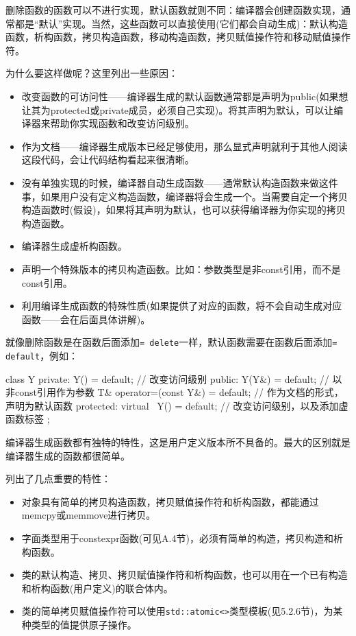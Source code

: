 
删除函数的函数可以不进行实现，默认函数就则不同：编译器会创建函数实现，通常都是“默认”实现。当然，这些函数可以直接使用(它们都会自动生成)：默认构造函数，析构函数，拷贝构造函数，移动构造函数，拷贝赋值操作符和移动赋值操作符。

为什么要这样做呢？这里列出一些原因：
\begin{itemize}
\item 改变函数的可访问性——编译器生成的默认函数通常都是声明为public(如果想让其为protected或private成员，必须自己实现)。将其声明为默认，可以让编译器来帮助你实现函数和改变访问级别。

\item 作为文档——编译器生成版本已经足够使用，那么显式声明就利于其他人阅读这段代码，会让代码结构看起来很清晰。

\item 没有单独实现的时候，编译器自动生成函数——通常默认构造函数来做这件事，如果用户没有定义构造函数，编译器将会生成一个。当需要自定一个拷贝构造函数时(假设)，如果将其声明为默认，也可以获得编译器为你实现的拷贝构造函数。

\item 编译器生成虚析构函数。

\item 声明一个特殊版本的拷贝构造函数。比如：参数类型是非const引用，而不是const引用。

\item 利用编译生成函数的特殊性质(如果提供了对应的函数，将不会自动生成对应函数——会在后面具体讲解)。
\end{itemize}

就像删除函数是在函数后面添加\texttt{= delete}一样，默认函数需要在函数后面添加\texttt{= default}，例如：

\begin{cpp}
class Y
{
private:
  Y() = default;  // 改变访问级别
public:
  Y(Y&) = default;  // 以非const引用作为参数
  T& operator=(const Y&) = default; // 作为文档的形式，声明为默认函数
protected:
  virtual ~Y() = default;  // 改变访问级别，以及添加虚函数标签
};
\end{cpp}

编译器生成函数都有独特的特性，这是用户定义版本所不具备的。最大的区别就是编译器生成的函数都很简单。

列出了几点重要的特性：

\begin{itemize}
\item 对象具有简单的拷贝构造函数，拷贝赋值操作符和析构函数，都能通过memcpy或memmove进行拷贝。

\item 字面类型用于constexpr函数(可见A.4节)，必须有简单的构造，拷贝构造和析构函数。

\item 类的默认构造、拷贝、拷贝赋值操作符和析构函数，也可以用在一个已有构造和析构函数(用户定义)的联合体内。

\item 类的简单拷贝赋值操作符可以使用\texttt{std::atomic<>}类型模板(见5.2.6节)，为某种类型的值提供原子操作。
\end{itemize}

